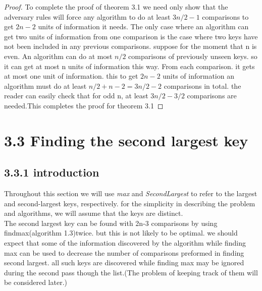\documentclass[a4paper,10pt,titlepage]{report}
\begin{document}
\begin{proof}


To complete the proof of theorem 3.1 we need only show that the adversary rules will force any algorithm to do at least $3n/2-1$ comparisons to get $2n-2$ units of information it needs. The only case where an algorithm can get two units of information from one comparison is the case where two keys have not been included in any previous comparisons. suppose for the moment that n is even. An algorithm can do at most $n/2$ comparisons of previously unseen keys. so it can get at most n units of information this way. From each comparison. it gets at most one unit of information. this to get $2n-2$ units of information an  algorithm must do at least $n/2 + n - 2 = 3n/2-2$ comparisons in total. the reader can easily check that for odd n, at least $3n/2 - 3/2$ comparisons are needed.This completes the proof for theorem 3.1
\end{proof}
\vspace{5mm}

\section{3.3 Finding the second largest key}
\subsection{3.3.1 introduction}
Throughout this section we will use \textit{max} and \textit{SecondLargest} to refer to the largest and second-largest keys, respectively. for the simplicity in describing the problem and algorithms, we will assume that the keys are distinct.\\
The second largest key can be found with 2n-3 comparisons by using findmax(algorithm 1.3)twice. but this is not likely to be optimal. we should expect that some of the information discovered by the algorithm while finding max can be used to decrease the number of comparisons preformed in finding second largest. all such keys are discovered while finding max may be ignored during the second pass though the list.(The problem of keeping track of them will be considered later.)\\
\end{document}
